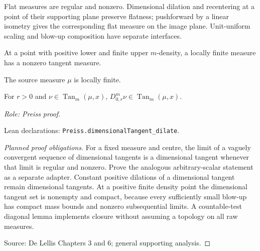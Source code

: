\begin{lemma}
\label{lem:plane-scaling}





Flat measures are regular and nonzero. Dimensional dilation and recentering at a point of their supporting plane preserve flatness; pushforward by a linear isometry gives the corresponding flat measure on the image plane. Unit-uniform scaling and blow-up composition have separate interfaces.
\end{lemma}

\begin{lemma}
\label{lem:tangent-existence}








At a point with positive lower and finite upper $m$-density, a locally finite measure has a nonzero tangent measure.
\end{lemma}

\begin{lemma}
\label{lem:dimensional-tangent-dilation}




The source measure $\mu$ is locally finite.



For $r>0$ and $\nu\in\operatorname{Tan}_m(\mu,x)$, $D^m_{0,r}\nu\in\operatorname{Tan}_m(\mu,x)$.
\par\emph{Role: Preiss proof.}
\par Lean declarations: \texttt{Preiss.dimensionalTangent\_dilate}.
\end{lemma}
\begin{proof}[Planned proof obligations]

For a fixed measure and centre, the limit of a vaguely convergent sequence of
dimensional tangents is a dimensional tangent whenever that limit is regular
and nonzero. Prove the analogous arbitrary-scalar statement as a separate
adapter. Constant positive dilations of a dimensional tangent remain dimensional
tangents. At a positive finite density point the dimensional tangent set is
nonempty and compact, because every sufficiently small blow-up has compact
mass bounds and nonzero subsequential limits. A countable-test diagonal lemma
implements closure without assuming a topology on all raw measures.
\par Source: De Lellis Chapters 3 and 6; general supporting analysis.
\end{proof}

